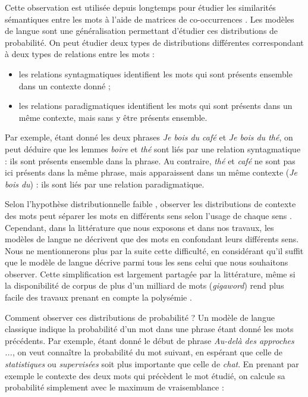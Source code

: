 Cette observation est utilisée depuis longtemps pour étudier les similarités
sémantiques entre les mots à l'aide de matrices de co-occurrences
\citep{miller1967empirical}. Les modèles de langue sont une généralisation
permettant d'étudier ces distributions de probabilité. On peut étudier deux
types de distributions différentes correspondant à deux types de relations
entre les mots \citep{sahlgren2008distributional} :

\begin{itemize}
    \item les relations syntagmatiques identifient les mots qui sont présents
        ensemble dans un contexte donné ;
    \item les relations paradigmatiques identifient les mots qui sont présents
        dans un même contexte, mais sans y être présents ensemble.
\end{itemize}

Par exemple, étant donné les deux phrases \textit{Je bois du café} et \textit{Je
bois du thé}, on peut déduire que les lemmes \textit{boire} et \textit{thé} sont
liés par une relation syntagmatique : ils sont présents ensemble dans la
phrase. Au contraire, \textit{thé} et \textit{café} ne sont pas ici présents dans
la même phrase, mais apparaissent dans un même contexte (\textit{Je bois du}) :
ils sont liés par une relation paradigmatique.

Selon l'hypothèse distributionnelle faible \citep{lenci2008distributional},
observer les distributions de contexte des mots peut séparer les mots en
différents sens selon l'usage de chaque sens
\citep{yarowsky1993one,pantel2002discovering,pedersen2010duluth}. Cependant,
dans la littérature que nous exposons et dans nos travaux, les modèles de
langue ne décrivent que des mots en confondant leurs différents sens. Nous ne
mentionnerons plus par la suite cette difficulté, en considérant qu'il suffit
que le modèle de langue décrive parmi tous les sens celui que nous souhaitons
observer. Cette simplification est largement partagée par la littérature, même
si la disponibilité de corpus de plus d'un milliard de mots (\textit{gigaword})
rend plus facile des travaux prenant en compte la polysémie
\citep{kawahara2014step}.

Comment observer ces distributions de probabilité ? Un modèle de langue
classique indique la probabilité d'un mot dans une phrase étant donné les mots
précédents. Par exemple, étant donné le début de phrase \textit{Au-delà des
approches ...}, on veut connaître la probabilité du mot suivant, en espérant
que celle de \textit{statistiques} ou \textit{supervisées} soit plus importante que
celle de \textit{chat}. En prenant par exemple le contexte des deux mots qui
précèdent le mot étudié, on calcule sa probabilité simplement avec le maximum
de vraisemblance :

